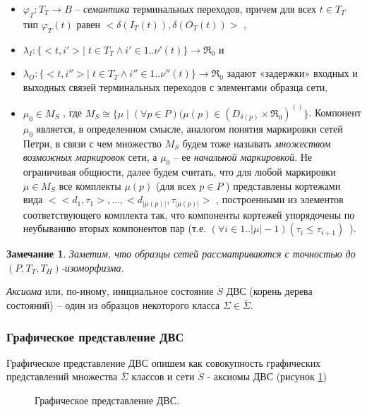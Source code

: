 \begin{itemize}
		  \item $ \varphi_T:T_T \rightarrow B $ – \textit{семантика} терминальных переходов, причем для всех  $ t \in T_T $    тип  $\varphi_T(t)$    равен  $ <\delta(I_T(t)),\delta(O_T(t))> $  ,
		  
		  \item $ \lambda_I:\{ <t,i'>|\;t\in T_T \wedge i' \in 1..\nu'(t) \} \rightarrow \Re_0 $ и
		  
		  \item $ \lambda_O:\{ <t,i''>|\;t\in T_T \wedge i'' \in 1..\nu''(t) \} \rightarrow \Re_0 $ задают «задержки» входных и выходных связей терминальных переходов с элементами образца сети,
		  
		  \item $ \mu_0 \in M_S $ , 
		  где $ M_S \cong \{ \mu\;|\; (\forall p \in P)(\mu(p) \in (D_{\delta(p)} \times \Re_0)^{()} \} $.
		  Компонент $ \mu_0 $    является, в определенном смысле, аналогом понятия маркировки сетей Петри,
		  в связи с чем множество  $ M_S $   будем тоже называть \textit{множеством возможных маркировок} сети,
		  а $\mu_0$   – ее \textit{начальной маркировкой}.
		  Не ограничивая общности, далее будем считать, что для любой маркировки  $\mu\in M_S$
		  все комплекты  $\mu(p)$  (для всех $p \in P$ ) представлены кортежами вида 
		  $ < <d_1,\tau_1>,...,<d_{|\mu(p)|}, \tau_{|\mu(p)|} > $  , 
		  построенными из элементов соответствующего комплекта так, 
		  что компоненты кортежей упорядочены по неубыванию вторых компонентов пар 
		  (т.е. $ (\forall i\in 1..|\mu|-1) (\tau_i \leq \tau_{i+1}) $~). 
		\end{itemize}
		 
		 \newtheorem{com}{Замечание}
		 \begin{com}\label{izomorph}
		 		Заметим, что образцы сетей рассматриваются с точностью до $(P, T_T, T_H)$-изоморфизма.
		 \end{com}
		 
		\textit{ Аксиома} или, по-иному, инициальное состояние $\dot{S}$ ДВС (корень дерева состояний) -- один из образцов некоторого класса $\Sigma \in \bar{\Sigma}$.
	\subsubsection{Графическое представление ДВС}
		Графическое представление ДВС опишем как совокупность графических представлений множества $\bar{\Sigma}$ классов 
		и сети $\dot{S}$ - аксиомы ДВС (рисунок \ref{img:DNC-graphic})
		\begin{figure}[h!]
			\caption{Графическое представление ДВС.}
			\label{img:DNC-graphic}
		\end{figure}
		
